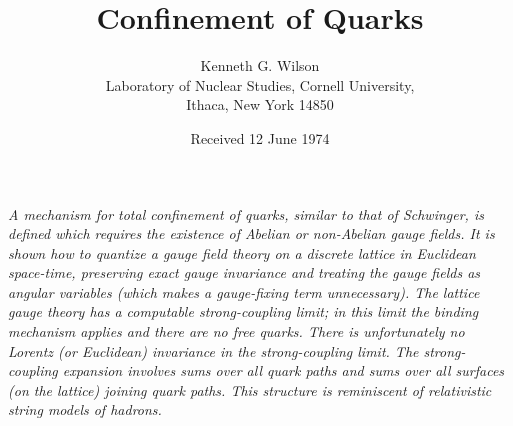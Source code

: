 \documentclass[11pt]{article}
\title{\textbf{Confinement of Quarks}}
\author{Kenneth G. Wilson\\[2mm]
        \normalsize Laboratory of Nuclear Studies, Cornell University,\\
        \normalsize Ithaca, New York 14850}
\date{Received 12 June 1974}
\begin{document}
\maketitle

\begin{center}
\begin{minipage}{0.86\textwidth}
\textit{A mechanism for total confinement of quarks, similar to that of
Schwinger, is defined which requires the existence of Abelian or
non-Abelian gauge fields.  It is shown how to quantize a gauge field
theory on a discrete lattice in Euclidean space-time, preserving exact
gauge invariance and treating the gauge fields as angular variables
(which makes a gauge-fixing term unnecessary).  The lattice gauge theory
has a computable strong-coupling limit; in this limit the binding
mechanism applies and there are no free quarks.  There is unfortunately
no Lorentz (or Euclidean) invariance in the strong-coupling limit.  The
strong-coupling expansion involves sums over all quark paths and sums
over all surfaces (on the lattice) joining quark paths.  This structure
is reminiscent of relativistic string models of hadrons.}
\end{minipage}
\end{center}








\end{document}
